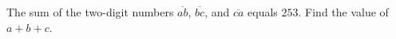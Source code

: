 The sum of the two-digit numbers $\overline{ab}$, $\overline{bc}$, and $\overline{ca}$ equals $253$. Find the value of $a+b+c$.
